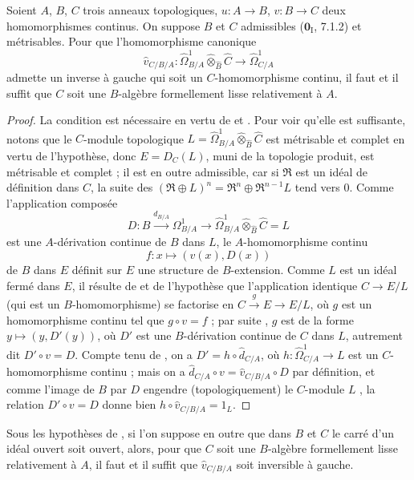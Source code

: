 \begin{proposition}[20.7.18]
\label{0.20.7.18-fr}
Soient $A$, $B$, $C$ trois anneaux topologiques, $u:A\to B$, $v:B\to C$
deux homomorphismes continus. On suppose $B$ et $C$ admissibles
($\mathbf{0}_{\mathrm I}$, 7.1.2) et métrisables. Pour que l'homomorphisme
canonique
\[
  \widehat v_{C/B/A}:\widehat{\Omega}^1_{B/A}
  \widehat\otimes_{\widehat B}\widehat C\to\widehat{\Omega}^1_{C/A}
\]
admette un inverse à gauche qui soit un $C$-homomorphisme continu, il faut et
il suffit que $C$ soit une $B$-algèbre formellement lisse relativement à $A$.
\end{proposition}

\begin{proof}
La condition est nécessaire en vertu de  et
. Pour voir qu'elle est suffisante, notons que le $C$-module
topologique
$L=\widehat{\Omega}^1_{B/A}\widehat\otimes_{\widehat B}\widehat C$ est
métrisable et
complet en vertu de l'hypothèse, donc $E=D_C(L)$, muni de la topologie produit,
est métrisable et complet ; il est en outre admissible, car si $\mathfrak{R}$
est un idéal de définition dans $C$, la suite des
$(\mathfrak{R}\oplus L)^n=\mathfrak{R}^n\oplus\mathfrak{R}^{n-1}L$ tend vers
$0$. Comme l'application composée
\[
  D:B\xrightarrow{d_{B/A}}\Omega^1_{B/A}\to
  \widehat{\Omega}^1_{B/A}\widehat\otimes_{\widehat B}\widehat C=L
\]
est une $A$-dérivation continue de $B$ dans $L$, le $A$-homomorphisme continu
\[
  f:x\longmapsto(v(x),D(x))
\]
de $B$ dans $E$ définit sur $E$ une structure de $B$-extension. Comme $L$ est
un idéal fermé dans $E$, il résulte de  et de l'hypothèse
que l'application identique $C\to E/L$ (qui est un $B$-homomorphisme) se
factorise en $C\xrightarrow{g}E\to E/L$, où $g$ est un homomorphisme continu
tel que $g\circ v=f$ ; par suite , $g$ est de la forme
$y\mapsto(y,D'(y))$, où $D'$ est une $B$-dérivation continue de $C$ dans $L$,
autrement dit $D'\circ v=D$. Compte tenu de , on a
$D'=h\circ\widehat d_{C/A}$, où
$h:\widehat{\Omega}^1_{C/A}\to L$ est un $C$-homomorphisme continu ; mais on
a $\widehat d_{C/A}\circ v=\widehat v_{C/B/A}\circ D$ par définition, et
comme l'image de $B$ par $D$ engendre (topologiquement) le $C$-module $L$
, la relation $D'\circ v=D$ donne bien
$h\circ\widehat v_{C/B/A}=1_L$.
\end{proof}

\begin{corollary}[20.7.19]
\label{0.20.7.19-fr}
Sous les hypothèses de , si l'on suppose en outre que dans
$B$ et $C$ le carré d'un idéal ouvert soit ouvert, alors, pour que $C$ soit
une $B$-algèbre formellement lisse relativement à $A$, il faut et il suffit
que $\widehat v_{C/B/A}$ soit inversible à gauche.
\end{corollary}

